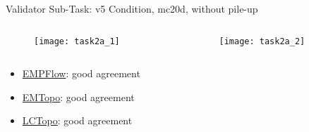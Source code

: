 \begin{frame}{Validator Sub-Task: v5 Condition, mc20d, without pile-up}
    \begin{columns}
        \begin{column}{0.5\textwidth}
            \begin{figure}
                \centering
                \texttt{[image: task2a\_1]}
            \end{figure}
        \end{column}
        \begin{column}{0.5\textwidth}
            \begin{figure}
                \centering
                \texttt{[image: task2a\_2]}
            \end{figure}
        \end{column}
    \end{columns}
        \begin{itemize}
        \item \href{https://atlas-computing.web.cern.ch/atlas-computing/links/PhysValDir/JetEtMiss/jet_21-07-08_task2a/AntiKt4EMPFlowJets/index.html}{EMPFlow}: good agreement
        \item \href{https://atlas-computing.web.cern.ch/atlas-computing/links/PhysValDir/JetEtMiss/jet_21-07-08_task2a/AntiKt4EMTopoJets/index.html}{EMTopo}: good agreement
        \item \href{https://atlas-computing.web.cern.ch/atlas-computing/links/PhysValDir/JetEtMiss/jet_21-07-08_task2a/AntiKt4LCTopoJets/index.html}{LCTopo}: good agreement
    \end{itemize}
\end{frame}